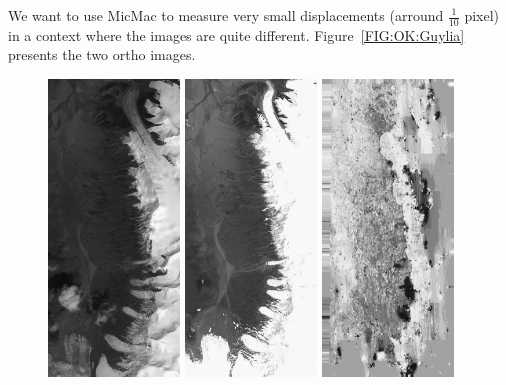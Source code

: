 We want to use MicMac to measure very small displacements (arround $\frac{1}{10}$ pixel) in
a context where the images are quite different. Figure~\ref{FIG:OK:Guylia} presents the two
ortho images.

\begin{figure}
\begin{center}
\includegraphics[width=35mm]{FIGS/SeismGuylia/250802_ortho.jpg}
\includegraphics[width=35mm]{FIGS/SeismGuylia/260608_ortho.jpg}
\includegraphics[width=35mm]{FIGS/SeismGuylia/Px1.jpg}

\end{center}
\end{figure}
